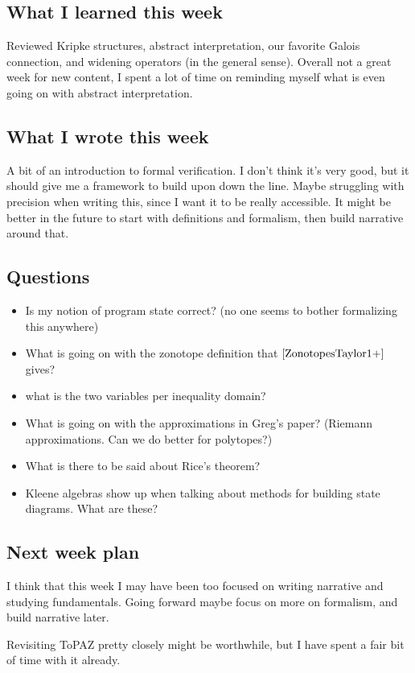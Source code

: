 \documentclass{amsart}
\begin{document}
\subsection{What I learned this week}
Reviewed Kripke structures, abstract interpretation, our favorite Galois connection, and widening operators (in the general sense).
Overall not a great week for new content, I spent a lot of time on reminding myself what is even going on with abstract interpretation.

\subsection{What I wrote this week}
A bit of an introduction to formal verification. 
I don't think it's very good, but it should give me a framework to build upon down the line.
Maybe struggling with precision when writing this, since I want it to be really accessible.
It might be better in the future to start with definitions and formalism, then build narrative around that.

\subsection{Questions}
\begin{itemize}
  \item Is my notion of program state correct? (no one seems to bother formalizing this anywhere)
  \item What is going on with the zonotope definition that $\cite{ZonotopesTaylor1+}$ gives?
  \item what is the two variables per inequality domain?
  \item What is going on with the approximations in Greg's paper? (Riemann approximations. Can we do better for polytopes?)
  \item What is there to be said about Rice's theorem?
  \item Kleene algebras show up when talking about methods for building state diagrams. What are these?
\end{itemize}

\subsection{Next week plan}
I think that this week I may have been too focused on writing narrative and studying fundamentals. 
Going forward maybe focus on more on formalism, and build narrative later.

Revisiting ToPAZ pretty closely might be worthwhile, but I have spent a fair bit of time with it already.
\end{document}
